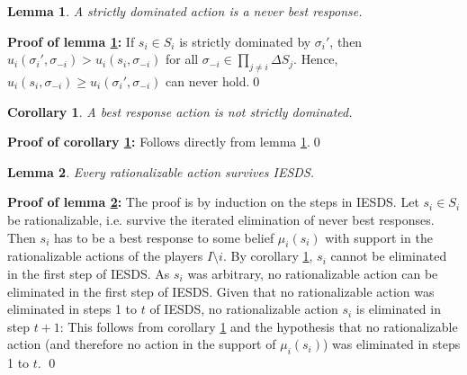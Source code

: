 \documentclass[a4paper,11pt]{article}
\newtheorem{lemma}{Lemma}
\newtheorem{corollary}{Corollary}
\begin{document}
\begin{lemma}\label{lem:sDomNeverBR}
  A strictly dominated action is a never best response.
\end{lemma}
\textbf{Proof of lemma \ref{lem:sDomNeverBR}: }If $s_i\in S_i$ is strictly dominated by $\sigma_i'$, then $u_i(\sigma_i',\sigma_{-i})>u_i(s_i,\sigma_{-i})$ for all $\sigma_{-i}\in \prod_{j\neq i} \Delta S_j$. Hence, $u_i(s_i,\sigma_{-i})\geq u_i(\sigma_i',\sigma_{-i})$ can never hold.\qed

\begin{corollary}\label{cor:brNotSDomed}
  A best response action is not strictly dominated.
\end{corollary}
\textbf{Proof of corollary \ref{cor:brNotSDomed}: }Follows directly from lemma \ref{lem:sDomNeverBR}.\qed

\begin{lemma}\label{lem:ratioInIESDS}
  Every rationalizable action survives IESDS.
\end{lemma}
\textbf{Proof of lemma \ref{lem:ratioInIESDS}: } The proof is by induction on the steps in IESDS. Let $s_i\in S_i$ be rationalizable, i.e. survive the iterated elimination of never best responses. Then $s_i$ has to be a best response to some belief $\mu_i(s_i)$ with support in the rationalizable actions of the players $I\setminus {i}$. By corollary \ref{cor:brNotSDomed}, $s_i$ cannot be eliminated in the first step of IESDS. As $s_i$ was arbitrary, no rationalizable action can be eliminated in the first step of IESDS. Given that no rationalizable action was eliminated in steps 1 to $t$ of IESDS, no rationalizable action $s_i$ is eliminated in step $t+1$: This follows from corollary \ref{cor:brNotSDomed} and the hypothesis that no rationalizable action (and therefore no action in the support of $\mu_i(s_i)$) was eliminated in steps 1 to $t$. \qed
\end{document}
